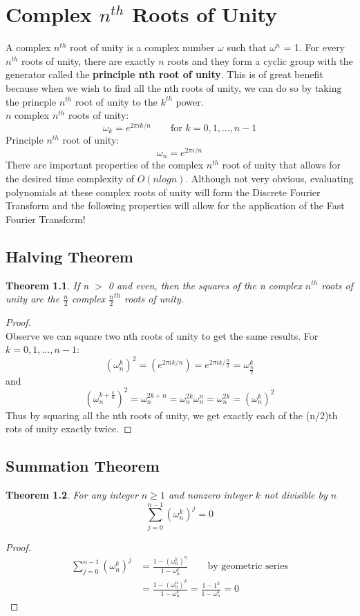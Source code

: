 \documentclass[11pt,leffttterpaper]{truthesis}
\theoremstyle{plain}
\newtheorem*{theorem*}{Theorem}
\begin{document}
\chapter{Complex \(n^{th}\) Roots of Unity}
A complex \(n^{th}\) root of unity is a complex number \(\omega\) such
that \(\omega^n\) = 1. For every \(n^{th}\) roots of unity, there are
exactly \(n\) roots and they form a cyclic group with the generator
called the \textbf{principle nth root of unity}. This is of great
benefit because when we wish to find all the nth roots of unity, we
can do so by taking the princple \(n^{th}\) root of unity to the \(k^{th}\) 
power.\\$ $\\
\(n\) complex \(n^{th}\) roots of unity:
\[
  \omega_k = e^{2\pi i k/n} \qquad \text{for } k = 0, 1, ..., n-1
\]
Principle \(n^{th}\) root of unity:
\[
  \omega_n = e^{2\pi i / n}
\]
There are important properties of the complex \(n^{th}\) root of unity
that allows for the desired time complexity of \(O(nlogn)\). Although
not very obvious, evaluating polynomials at these complex roots of unity
will form the Discrete Fourier Transform and the following
properties will allow for the application of the Fast Fourier Transform!

\section{Halving Theorem}
\begin{theorem*}
  If n \(>\) 0 and even, then the squares of the n complex \(n^{th}\) roots
  of unity are the \(\tfrac{n}{2}\) complex \(\tfrac{n}{2}^{th}\) roots
  of unity.
\end{theorem*}
\begin{proof}
  $ $\\
  Observe we can square two nth roots of unity to get
  the same results. For \(k = 0, 1, ..., n-1\):
  \[
    (\omega_n^k)^2 = (e^{2\pi i k/n}) = e^{2\pi i k / \tfrac{n}{2}} = \omega_{\tfrac{n}{2}}^k
  \]
  and
  \[
    (\omega_n^{k+\tfrac{k}{n}})^2 = \omega_n^{2k+n} = \omega_n^{2k}\omega_n^n = \omega_n^{2k} = (\omega_n^k)^2
  \]
  Thus by squaring all the nth roots of unity, we get exactly each of the
  (n/2)th rots of unity exactly twice.
\end{proof}

\section{Summation Theorem}
\begin{theorem*}
  For any integer \(n \ge 1\) and nonzero integer \(k\) not divisible by
  \(n\)
  \[
    \sum_{j = 0}^{n-1}(\omega_n^k)^j = 0
  \]
\end{theorem*}
\begin{proof}
  \begin{align*}
    \sum_{j = 0}^{n-1}(\omega_n^k)^j &= \frac{1-(\omega_n^k)^n}{1-\omega_n^k}\qquad \text{by geometric series} \\
                                     &= \frac{1-(\omega_n^n)^k}{1-\omega_n^k} = \frac{1-1^k}{1-\omega_n^k} = 0
  \end{align*}
\end{proof}
\end{document}
